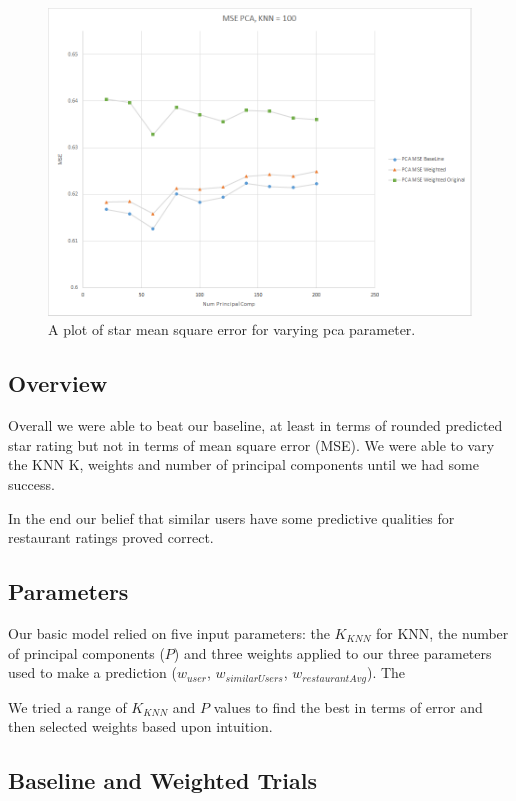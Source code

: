 \documentclass[10pt,twocolumn,letterpaper]{article}
\newcommand{\wu}{\ensuremath{w_{user}}}
\newcommand{\ws}{\ensuremath{w_{similarUsers}}}
\newcommand{\wrst}{\ensuremath{w_{restaurantAvg}}}
\begin{document}
\begin{figure}[t]
\begin{center}
   \includegraphics[width=0.9\linewidth]{pcaMSE.png}
\end{center}
   \caption{A plot of star mean square error for varying pca parameter.}
\label{fig:pcaMSE}
\end{figure}

\subsection{Overview}
Overall we were able to beat our baseline, at least in terms of rounded predicted star rating but not in terms of mean square error (MSE). We were able to vary the KNN K, weights and number of principal components until we had some success.

In the end our belief that similar users have some predictive qualities for restaurant ratings proved correct.

\subsection{Parameters}
Our basic model relied on five input parameters: the $K_{KNN}$ for KNN, the number of principal components ($P$) and three weights applied to our three parameters used to make a prediction (\wu, \ws, \wrst). The 

We tried a range of $K_{KNN}$ and $P$ values to find the best in terms of error and then selected weights based upon intuition.

\subsection{Baseline and Weighted Trials}
\end{document}
